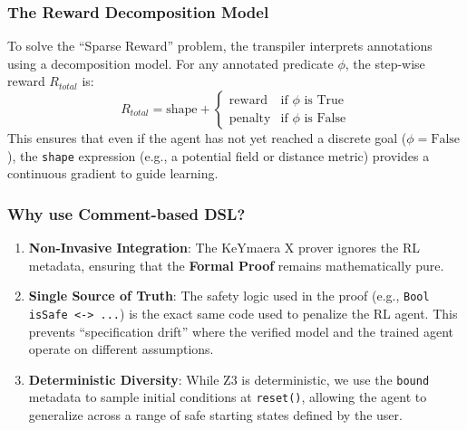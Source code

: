 \documentclass{article}
\begin{document}
\subsubsection{The Reward Decomposition Model}
To solve the ``Sparse Reward'' problem, the transpiler interprets annotations using a decomposition model. For any annotated predicate $\phi$, the step-wise reward $R_{total}$ is:
\[
R_{total} = \text{shape} + 
\begin{cases} 
\text{reward} & \text{if } \phi \text{ is True} \\
\text{penalty} & \text{if } \phi \text{ is False}
\end{cases}
\]
This ensures that even if the agent has not yet reached a discrete goal ($\phi = \text{False}$), the \texttt{shape} expression (e.g., a potential field or distance metric) provides a continuous gradient to guide learning.

\subsubsection{Why use Comment-based DSL?}
\begin{enumerate}
    \item \textbf{Non-Invasive Integration}: The KeYmaera X prover ignores the RL metadata, ensuring that the \textbf{Formal Proof} remains mathematically pure.
    \item \textbf{Single Source of Truth}: The safety logic used in the proof (e.g., \texttt{Bool isSafe <-> ...}) is the exact same code used to penalize the RL agent. This prevents ``specification drift'' where the verified model and the trained agent operate on different assumptions.
    \item \textbf{Deterministic Diversity}: While Z3 is deterministic, we use the \texttt{bound} metadata to sample initial conditions at \texttt{reset()}, allowing the agent to generalize across a range of safe starting states defined by the user.
\end{enumerate}
\end{document}
